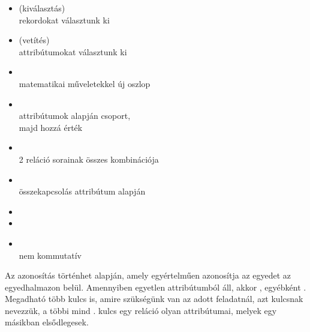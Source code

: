 \documentclass[main.tex]{subfiles}
\begin{document}
  \vspace{1em}
  \begin{minipage}[t]{0.5\textwidth}
    \begin{itemize}
      \item {} (kiválasztás) \\
      \tabto{5mm} rekordokat választunk ki
      
      \item {} (vetítés) \\
      \tabto{5mm} attribútumokat választunk ki

      \item {} \\
      \tabto{5mm} matematikai műveletekkel új oszlop

      \item {} \\
      \tabto{5mm} attribútumok alapján csoport, \\
      \tabto{5mm} majd hozzá érték
    \end{itemize}
  \end{minipage}\hfill
  \begin{minipage}[t]{0.5\textwidth}
    \begin{itemize}
      \item {} \\
      \tabto{5mm} 2 reláció sorainak összes kombinációja

      \item {} \\
      \tabto{5mm} összekapcsolás attribútum alapján

      \item {}

      \item {}

      \item {} \\
      \tabto{5mm} nem kommutatív
    \end{itemize}
  \end{minipage}

  Az azonosítás történhet  alapján,
  amely egyértelműen azonosítja az egyedet az egyedhalmazon belül.
  Amennyiben egyetlen attribútumból áll, akkor ,
  egyébként .
  Megadható több kulcs is, amire szükségünk van az adott
  feladatnál, azt  kulcsnak nevezzük,
  a többi mind .  kulcs egy
  reláció olyan attribútumai, melyek egy másikban elsődlegesek.
\end{document}
